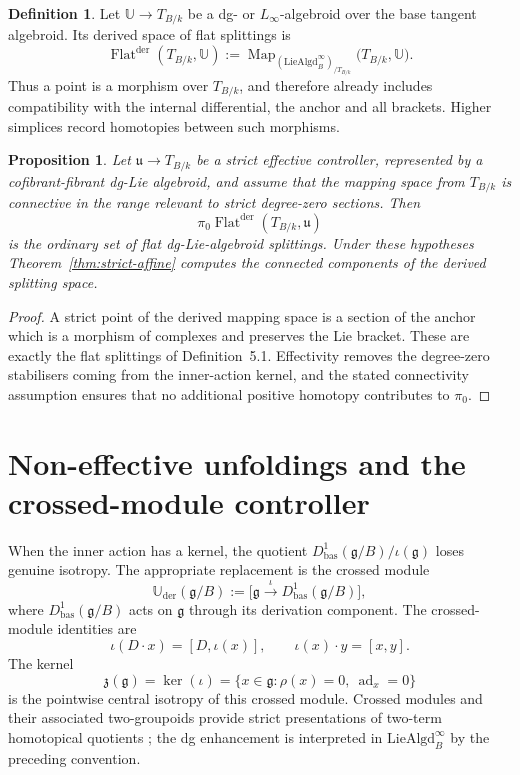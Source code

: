\documentclass[11pt,reqno,a4paper,dvipsnames,x11names]{amsart}
\numberwithin{equation}{section}
\theoremstyle{plain}
\newtheorem{proposition}[theorem]{Proposition}
\theoremstyle{definition}
\newtheorem{definition}[theorem]{Definition}
\theoremstyle{remark}
\DeclareMathOperator{\Map}{Map}
\newcommand{\kk}{k}
\newcommand{\g}{\mathfrak g}
\newcommand{\z}{\mathfrak z}
\newcommand{\Uder}{\mathbb U_{\mathrm{der}}}
\newcommand{\xto}[1]{\xrightarrow{#1}}
\newcommand{\bas}{\mathrm{bas}}
\begin{document}
\begin{definition}\label{def:derived-flat-space}
Let \(\mathbb U\to T_{B/\kk}\) be a dg- or \(L_\infty\)-algebroid over the base tangent algebroid. Its derived space of flat splittings is
\[
 \operatorname{Flat}^{\mathrm{der}}(T_{B/\kk},\mathbb U)
 :=
 \Map_{(\mathrm{LieAlgd}^{\infty}_{B})_{/T_{B/\kk}}}
 \bigl(T_{B/\kk},\mathbb U\bigr).
\]
Thus a point is a morphism over \(T_{B/\kk}\), and therefore already includes compatibility with the internal differential, the anchor and all brackets. Higher simplices record homotopies between such morphisms.
\end{definition}

\begin{proposition}\label{prop:strict-flat-pi0}
Let \(\mathfrak u\to T_{B/\kk}\) be a strict effective controller, represented by a cofibrant-fibrant dg-Lie algebroid, and assume that the mapping space from \(T_{B/\kk}\) is connective in the range relevant to strict degree-zero sections. Then
\[
 \pi_0\operatorname{Flat}^{\mathrm{der}}(T_{B/\kk},\mathfrak u)
\]
is the ordinary set of flat dg-Lie-algebroid splittings. Under these hypotheses Theorem~\ref{thm:strict-affine} computes the connected components of the derived splitting space.
\end{proposition}

\begin{proof}
A strict point of the derived mapping space is a section of the anchor which is a morphism of complexes and preserves the Lie bracket. These are exactly the flat splittings of Definition~5.1. Effectivity removes the degree-zero stabilisers coming from the inner-action kernel, and the stated connectivity assumption ensures that no additional positive homotopy contributes to \(\pi_0\).
\end{proof}

\section{Non-effective unfoldings and the crossed-module controller}\label{sec:higher}

When the inner action has a kernel, the quotient
\(D^1_{\bas}(\g/B)/\iota(\g)\) loses genuine isotropy. The appropriate replacement is the crossed module
\[
 \Uder(\g/B)
 :=\bigl[\g\xto{\iota}D^1_{\bas}(\g/B)\bigr],
\]
where \(D^1_{\bas}(\g/B)\) acts on \(\g\) through its derivation component. The crossed-module identities are
\[
 \iota(D\cdot x)=[D,\iota(x)],
 \qquad
 \iota(x)\cdot y=[x,y].
\]
The kernel
\[
 \z(\g)=\ker(\iota)
 =\{x\in\g:\rho(x)=0,\ \operatorname{ad}_x=0\}
\]
is the pointwise central isotropy of this crossed module. Crossed modules and their associated two-groupoids provide strict presentations of two-term homotopical quotients \cite{BrownSpencer76,Noohi07}; the dg enhancement is interpreted in \(\mathrm{LieAlgd}^{\infty}_{B}\) by the preceding convention.
\end{document}
